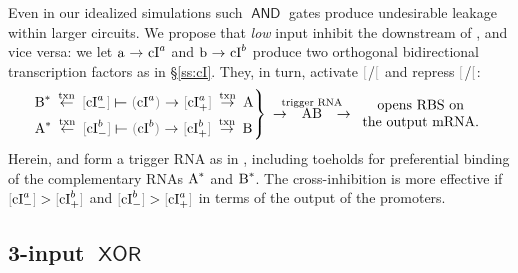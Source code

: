 \documentclass[12pt,notitlepage]{article}
\let\cite\citep
\newcommand{\AND}{\ensuremath{\mathop{\mathsf{AND}}}\xspace}
\newcommand{\XOR}{\ensuremath{\mathop{\mathsf{XOR}}}\xspace}
\newcommand{\cbra}[1]{{\ensuremath{\color{gray}{#1}}}}
\newcommand{\protein}[1]{{{\cbra{(}\ce{#1}\cbra{)}}}}
\newcommand{\promoter}[1]{{{\cbra{[}\ce{#1}\cbra{]}}}}
\newcommand{\act}{\ {\ensuremath{\mathbin{\to}}}\ }
\newcommand{\rep}{\ {\ensuremath{\mathrel{\raisebox{-.3ex}{\rotatebox{90}{\scalebox{1}[1.2]{$\bot$}}}}}}\ }
\begin{document}
Even in our idealized simulations
such \AND gates produce undesirable leakage
within larger circuits.
%
%
%
We propose that
\emph{low} input  
{inhibit} the downstream of ,
and vice versa:
%
we let $\ce{a} \act \ce{cI^a}$
and
$\ce{b} \act \ce{cI^b}$
produce
two orthogonal 
bidirectional
transcription factors as in \S\ref{ss:cI}.
%
They, in turn, 
activate \promoter{cI^a_+}/\promoter{cI^b_+}
and 
repress \promoter{cI^a_-}/\promoter{cI^b_-}:
%
%
\begin{align}
    \begin{rcases*}
        \ce{B^*} 
        \stackrel{\text{txn}}{\reflectbox{\act}}
        \promoter{cI^a_-} \reflectbox{\rep} \protein{cI^a} \act \promoter{cI^a_+} 
        \stackrel{\text{txn}}{\act}
        \ce{A}
        \\
        \ce{A^*}
        \stackrel{\text{txn}}{\reflectbox{\act}}
        \promoter{cI^b_-} \reflectbox{\rep} \protein{cI^b} \act \promoter{cI^b_+} 
        \stackrel{\text{txn}}{\act}
        \ce{B}
    \end{rcases*}
    \act 
    \stackrel{\hspace{-10pt}\smash{\text{trigger RNA}}\hspace{-10pt}}{\ce{AB}}
    \act 
    \begin{array}{c}
        \text{opens RBS on} \\ \text{the output mRNA.}
    \end{array}
\end{align}
%
%
Herein,
 and  
form a trigger RNA  as in
\cite[\href{https://www.nature.com/articles/nature23271/figures/2}{Fig.~2e}]{GreenETAL2017},
including toeholds
for preferential binding 
of the complementary RNAs $\ce{A^*}$ and $\ce{B^*}$.
%
%
The cross-inhibition is more effective
if
$\promoter{cI^a_-} > \promoter{cI^b_+}$
and
$\promoter{cI^b_-} > \promoter{cI^a_+}$
in terms of the output of the promoters.
%
%





%


\subsection{3-input \texorpdfstring{\XOR}{XOR}} \label{ss:3xor}
\end{document}

